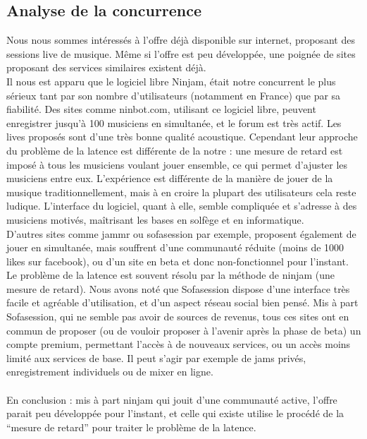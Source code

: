 \documentclass[a4,12pt]{article}
\begin{document}
\subsection{Analyse de la concurrence}
Nous nous sommes intéressés à l’offre déjà disponible sur internet, proposant des sessions live de musique. Même si l’offre est peu développée, une poignée de sites proposant des services similaires existent déjà.\\
Il nous est apparu que le logiciel libre Ninjam, était notre concurrent le plus sérieux tant par son nombre d’utilisateurs (notamment en France) que par sa fiabilité. Des sites comme ninbot.com, utilisant ce logiciel libre, peuvent enregistrer jusqu’à 100 musiciens en simultanée, et le forum est très actif. Les lives proposés sont d’une très bonne qualité acoustique. Cependant leur approche du problème de la latence est différente de la notre : une mesure de retard est imposé à tous les musiciens voulant jouer ensemble, ce qui permet d’ajuster les musiciens entre eux. L’expérience est différente de la manière de jouer de la musique traditionnellement, mais à en croire la plupart des utilisateurs cela reste ludique. L’interface du logiciel, quant à elle, semble compliquée et s’adresse à des musiciens motivés, maîtrisant les bases en solfège et en informatique.\\
D’autres sites comme jammr ou sofasession par exemple, proposent également de jouer en simultanée, mais souffrent d’une communauté réduite (moins de 1000 likes sur facebook), ou d’un site en beta et donc non-fonctionnel pour l’instant. Le problème de la latence est souvent résolu par la méthode de ninjam (une mesure de retard). Nous avons noté que Sofasession dispose d’une interface très facile et agréable d’utilisation, et d’un aspect réseau social bien pensé.
Mis à part Sofasession, qui ne semble pas avoir de sources de revenus, tous ces sites ont en commun de proposer (ou de vouloir proposer à l’avenir après la phase de beta) un compte premium, permettant l'accès à de nouveaux services, ou un accès moins limité aux services de base. Il peut s’agir par exemple de jams privés, enregistrement individuels ou de mixer en ligne.\\
\\
En conclusion : mis à part ninjam qui jouit d’une communauté active, l’offre parait peu développée pour l’instant, et celle qui existe utilise le procédé de la “mesure de retard” pour traiter le problème de la latence.
\end{document}
